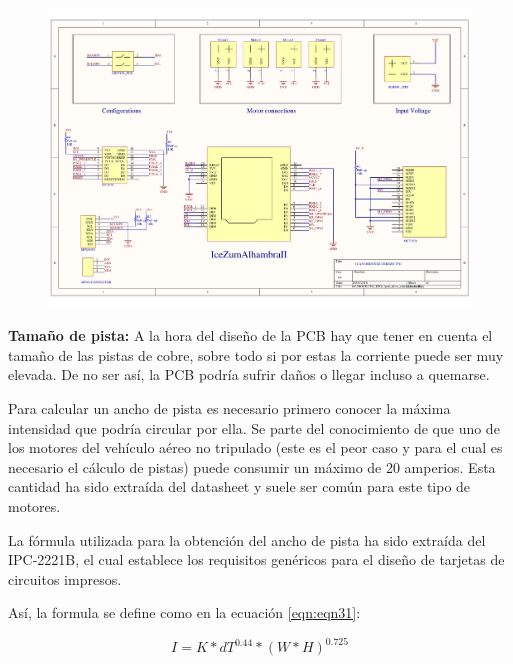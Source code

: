 \begin{center}
	\begin{figure}[H]
		\center
		\includegraphics[scale=0.8, angle=90]{imagenes/Balancing_Robot/pcb_dron_schematic.pdf}
		\caption{}
		\label{fig:schematics_tfg}
	\end{figure}
\end{center}
\newpage

\textbf{Tamaño de pista: } \newline
A la hora del diseño de la PCB hay que tener en cuenta el tamaño de las pistas de cobre, sobre todo si por estas la corriente puede ser muy elevada. De no ser así, la PCB podría sufrir daños o llegar incluso a quemarse. \newline

Para calcular un ancho de pista es necesario primero conocer la máxima intensidad que podría circular por ella. Se parte del conocimiento de que uno de los motores del vehículo aéreo no tripulado (este es el peor caso y para el cual es necesario el cálculo de pistas) puede consumir un máximo de 20 amperios. Esta cantidad ha sido extraída del datasheet y suele ser común para este tipo de motores. \newline

La fórmula utilizada para la obtención del ancho de pista ha sido extraída del IPC-2221B, el cual establece los requisitos genéricos para el diseño de tarjetas de circuitos impresos. \newline

Así, la formula se define como en la ecuación \ref{eqn:eqn31}: 

\begin{equation}
		I = K * dT^{0.44}*(W*H)^{0.725}
\label{eqn:eqn31}
\end{equation}

